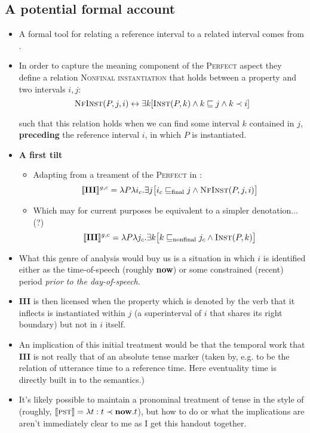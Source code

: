 \documentclass[11pt,dvipsnames]{article}
\begin{document}
\subsection*{A potential formal account}
\begin{itemize}
\item  A formal tool for relating a reference interval to a related interval comes from \citet{Condoravdi2014}.
\item  In order to capture the meaning component of the \textsc{Perfect} aspect they define a relation \textsc{Nonfinal instantiation} that holds between a property and two intervals $i,j$:
$$\textsc{NfInst}(P,j,i)\leftrightarrow\exists k [\textsc{Inst}(P,k)\wedge k\sqsubseteq j\wedge k\prec i]$$

such that this relation holds when we can find some interval $k$ contained in $j$, \textbf{preceding} the reference interval $i$, in which $P$ is instantiated.

\item \textbf{A first tilt}
\begin{itemize}


\item Adapting from a treament of the \textsc{Perfect} in \citet{Condoravdi2014}:
$$\llbracket\textbf{III}\rrbracket^{g,c}=\lambda P\lambda i_c.\exists j\big[i_c\sqsubseteq_{\text{final}}j\wedge\textsc{NfInst}(P,j,i)\big]$$

\item  Which may for current purposes be equivalent to a simpler denotation...(?)
$$\llbracket\textbf{III}\rrbracket^{g,c}=\lambda P\lambda j_c.\exists k\big[k\sqsubseteq_{\text{nonfinal}}j_c\wedge\textsc{Inst}(P,k)\big]$$

\end{itemize}

\item What this genre of analysis would buy us is a situation in which $i$ is identified either as the time-of-speech (roughly \textbf{now}) or some constrained (recent) period \textit{prior to the day-of-speech}.


\item \textbf{III} is then licensed when the property which is denoted by the verb that it inflects is instantiated within $j$ (a superinterval of $i$ that shares its right boundary) but not in $i$ itself.




\item An implication of this initial treatment would be that the temporal work that \textbf{III} is not really that of an absolute tense marker (taken by, e.g. \citealt{Klein2009} to be the relation of utterance time to a reference time. Here eventuality time is directly built in to the semantics.)
\
\item It's likely possible to maintain a pronominal treatment of tense in the style of \citet{Partee1973} (roughly, $\llbracket\textsc{pst}\rrbracket=\lambda t:t\prec\textbf{now}.t$), but how to do or what the implications are aren't immediately clear to me as I get this handout together.


\end{itemize}
\end{document}
